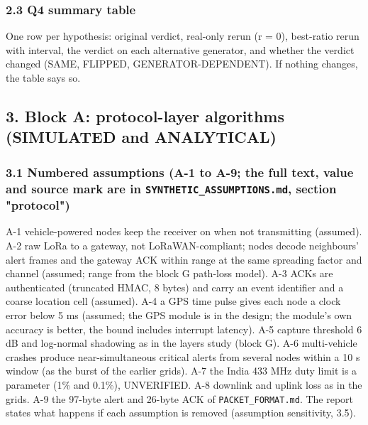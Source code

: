 \subsubsection*{2.3 Q4 summary table}
One row per hypothesis: original verdict, real-only rerun (r = 0), best-ratio rerun with interval, the verdict on each alternative generator, and whether the verdict changed (SAME, FLIPPED, GENERATOR-DEPENDENT). If nothing changes, the table says so.

\subsection*{3. Block A: protocol-layer algorithms (SIMULATED and ANALYTICAL)}

\subsubsection*{3.1 Numbered assumptions (A-1 to A-9; the full text, value and source mark are in \texttt{SYNTHETIC\_ASSUMPTIONS.md}, section "protocol")}
A-1 vehicle-powered nodes keep the receiver on when not transmitting (assumed). A-2 raw LoRa to a gateway, not LoRaWAN-compliant; nodes decode neighbours' alert frames and the gateway ACK within range at the same spreading factor and channel (assumed; range from the block G path-loss model). A-3 ACKs are authenticated (truncated HMAC, 8 bytes) and carry an event identifier and a coarse location cell (assumed). A-4 a GPS time pulse gives each node a clock error below 5 ms (assumed; the GPS module is in the design; the module's own accuracy is better, the bound includes interrupt latency). A-5 capture threshold 6 dB and log-normal shadowing as in the layers study (block G). A-6 multi-vehicle crashes produce near-simultaneous critical alerts from several nodes within a 10 s window (as the burst of the earlier grids). A-7 the India 433 MHz duty limit is a parameter (1\% and 0.1\%), UNVERIFIED. A-8 downlink and uplink loss as in the grids. A-9 the 97-byte alert and 26-byte ACK of \texttt{PACKET\_FORMAT.md}. The report states what happens if each assumption is removed (assumption sensitivity, 3.5).

